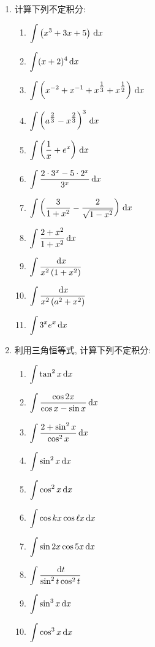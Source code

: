 \begin{ex}
\begin{enumerate}
    \item 计算下列不定积分:
\begin{multicols}{2}
\begin{enumerate}
\item  $\displaystyle\int\left(x^{3}+3 x+5\right) \,{\rm d} x$
\item  $\displaystyle\int(x+2)^{4} \,{\rm d} x$
\item  $\displaystyle\int\left(x^{-2}+x^{-1}+x^{\tfrac{1}{3}}+x^{\tfrac{1}{2}}\right) \,{\rm d} x$
\item  $\displaystyle\int\left(a^{\tfrac{2}{3}}-x^{\tfrac{2}{3}}\right)^{3} \,{\rm d} x$
\item  $\displaystyle\int\left(\dfrac{1}{x}+e^{x}\right) \,{\rm d} x$
\item  $\displaystyle\int \dfrac{2 \cdot 3^{x}-5 \cdot 2^{x}}{3^{x}} \,{\rm d} x$
\item  $\displaystyle\int \left(\dfrac{3}{1+x^{2}}-\dfrac{2}{\sqrt{1-x^{2}}}\right) \,{\rm d} x$
\item  $\displaystyle\int \dfrac{2+x^{2}}{1+x^{2}} \,{\rm d} x$
\item  $\displaystyle\int \dfrac{\,{\rm d} x}{x^{2}\left(1+x^{2}\right)}$
\item  $\displaystyle\int \dfrac{\,{\rm d} x}{x^{2}\left(a^{2}+x^{2}\right)}$
\item  $\displaystyle\int 3^{x} e^{x} \,{\rm d} x$
\end{enumerate}
\end{multicols}

\item  利用三角恒等式, 计算下列不定积分:
    \begin{multicols}{2}
        \begin{enumerate}
    \item  $\displaystyle\int \tan^{2} x \,{\rm d} x$
    \item  $\displaystyle\int \dfrac{\cos 2 x}{\cos x-\sin x} \,{\rm d} x$
    \item  $\displaystyle\int \dfrac{2+\sin ^{2} x}{\cos ^{2} x} \,{\rm d} x$
    \item  $\displaystyle\int \sin ^{2} x \,{\rm d} x$
    \item  $\displaystyle\int \cos ^{2} x \,{\rm d} x$
    \item  $\displaystyle\int \cos k x \cos \ell x \,{\rm d} x$
    \item  $\displaystyle\int \sin 2 x \cos 5 x \,{\rm d} x$
    \item  $\displaystyle\int \dfrac{\,{\rm d} t}{\sin ^{2} t \cos ^{2} t}$
    \item  $\displaystyle\int \sin ^{3} x \,{\rm d} x$
    \item  $\displaystyle\int \cos ^{3} x \,{\rm d} x$
\end{enumerate}
\end{multicols}    


\end{enumerate}
\end{ex}
